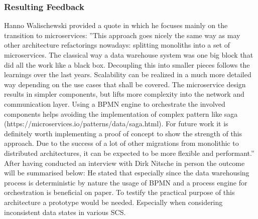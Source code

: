 \subsubsection{Resulting Feedback}
Hanno Walischewski provided a quote in which he focuses mainly on the transition to microservices:\newline
''This approach goes nicely the same way as may other architecture refactorings nowadays: splitting monoliths into a set of microservices. The classical way a data warehouse system was one big block that did all the work like a black box. Decoupling this into smaller pieces follows the learnings over the last years. Scalability can be realized in a much more detailed way depending on the use cases that shall be covered.\newline
The microservice design results in simpler components, but lifts more complexity into the network and communication layer. Using a BPMN engine to orchestrate the involved components helps avoiding the implementation of complex pattern like saga (https://microservices.io/patterns/data/saga.html).\newline
For future work it is definitely worth implementing a proof of concept to show the strength of  this approach. Due to the success of a lot of other migrations from monolithic to distributed architectures, it can be expected to be more flexible and performant.'' \cite{hanno}\newline
\\
After having conducted an interview with Dirk Nitsche in person the outcome will be summarised below:\newline
He stated that especially since the data warehousing process is deterministic by nature the usage of BPMN and a process engine for orchestration is beneficial on paper. To testify the practical purpose of this architecture a prototype would be needed. Especially when considering inconsistent data states in various SCS. 
\cite{dirk}\newline
